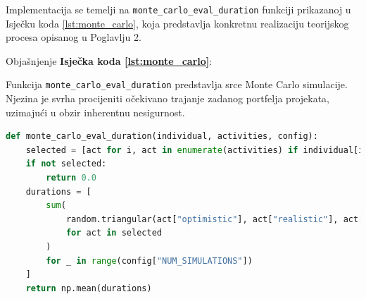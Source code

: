 Implementacija se temelji na \texttt{monte\_carlo\_eval\_duration} funkciji prikazanoj u Isječku koda \ref{lst:monte_carlo}, koja predstavlja konkretnu realizaciju teorijskog procesa opisanog u Poglavlju 2. 

Objašnjenje \textbf{Isječka koda \ref{lst:monte_carlo}}:

Funkcija \texttt{monte\_carlo\_eval\_duration} predstavlja srce Monte Carlo simulacije. Njezina je svrha procijeniti očekivano trajanje zadanog portfelja projekata, uzimajući u obzir inherentnu nesigurnost.

\begin{lstlisting}[float, language=Python, caption={Funkcija za Monte Carlo procjenu trajanja}, label={lst:monte_carlo}, captionpos=b]
def monte_carlo_eval_duration(individual, activities, config):
    selected = [act for i, act in enumerate(activities) if individual[i] == 1]
    if not selected:
        return 0.0
    durations = [
        sum(
            random.triangular(act["optimistic"], act["realistic"], act["pessimistic"])
            for act in selected
        )
        for _ in range(config["NUM_SIMULATIONS"])
    ]
    return np.mean(durations)
\end{lstlisting}

